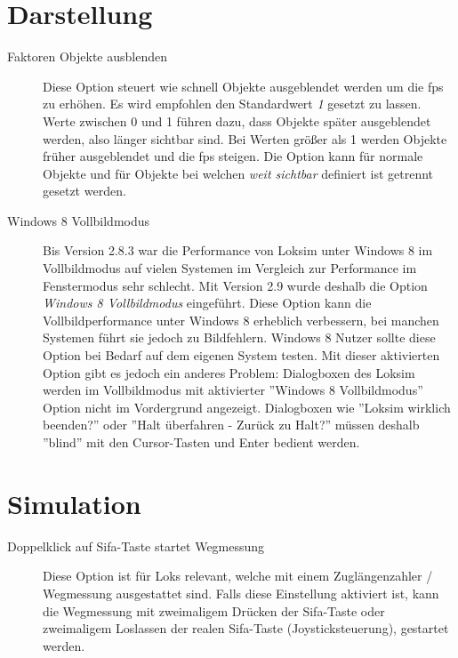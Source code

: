 \section{Darstellung}
\label{sec.sim.optionen.darstellung}
\begin{description}
\item[Faktoren Objekte ausblenden] Diese Option steuert wie schnell Objekte ausgeblendet werden um die fps zu erhöhen. Es wird empfohlen den Standardwert \emph{1} gesetzt zu lassen. Werte zwischen 0 und 1 führen dazu, dass Objekte später ausgeblendet werden, also länger sichtbar sind. Bei Werten größer als 1 werden Objekte früher ausgeblendet und die fps steigen. Die Option kann für normale Objekte und für Objekte bei welchen \emph{weit sichtbar} definiert ist getrennt gesetzt werden.
\item[Windows 8 Vollbildmodus] Bis Version 2.8.3 war die Performance von Loksim unter Windows 8 im Vollbildmodus auf vielen Systemen im Vergleich zur Performance im Fenstermodus sehr schlecht. Mit Version 2.9 wurde deshalb die Option \emph{Windows 8 Vollbildmodus} eingeführt. Diese Option kann die Vollbildperformance unter Windows 8 erheblich verbessern, bei manchen Systemen führt sie jedoch zu Bildfehlern. Windows 8 Nutzer sollte diese Option bei Bedarf auf dem eigenen System testen. Mit dieser aktivierten Option gibt es jedoch ein anderes Problem:
Dialogboxen des Loksim werden im Vollbildmodus mit aktivierter ''Windows 8 Vollbildmodus'' Option nicht im Vordergrund angezeigt.
Dialogboxen wie ''Loksim wirklich beenden?'' oder ''Halt überfahren - Zurück zu Halt?'' müssen deshalb ''blind'' mit den Cursor-Tasten und Enter bedient  werden.


\end{description}

\section{Simulation}
\label{sec.sim.optionen.simulation}
\begin{description}
\item[Doppelklick auf Sifa-Taste startet Wegmessung] Diese Option ist für Loks relevant, welche mit einem Zuglängenzahler / Wegmessung ausgestattet sind. Falls diese Einstellung aktiviert ist, kann die Wegmessung mit zweimaligem Drücken der Sifa-Taste oder zweimaligem Loslassen der realen Sifa-Taste (Joysticksteuerung), gestartet werden.
\end{description}

